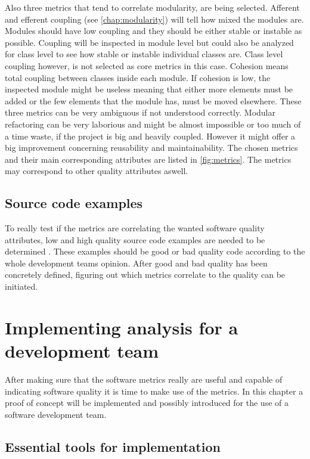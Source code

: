 Also three metrics that tend to correlate modularity, are being selected. Afferent and efferent coupling (see \autoref{chap:modularity}) will tell how mixed the modules are. Modules should have low coupling and they should be either stable or instable as possible. Coupling will be inspected in module level but could also be analyzed for class level to see how stable or instable individual classes are. Class level coupling however, is not selected as core metrics in this case. Cohesion means total coupling between classes inside each module. If cohesion is low, the inspected module might be useless meaning that either more elements must be added or the few elements that the module has, must be moved elsewhere. These three metrics can be very ambiguous if not understood correctly. Modular refactoring can be very laborious and might be almost impossible or too much of a time waste, if the project is big and heavily coupled. However it might offer a big improvement concerning reusability and maintainability. The chosen metrics and their main corresponding attributes are listed in \autoref{fig:metrics}. The metrics may correspond to other quality attributes aswell. 

\section{Source code examples}
To really test if the metrics are correlating the wanted software quality attributes, low and high quality source code examples are needed to be determined \cite{coleman1994using}. These examples should be good or bad quality code according to the whole development teams opinion. After good and bad quality has been concretely defined, figuring out which metrics correlate to the quality can be initiated. 




\chapter{Implementing analysis for a development team}

After making sure that the software metrics really are useful and capable of indicating software quality it is time to make use of the metrics. In this chapter a proof of concept will be implemented and possibly introduced for the use of a software development team.

\section{Essential tools for implementation}

